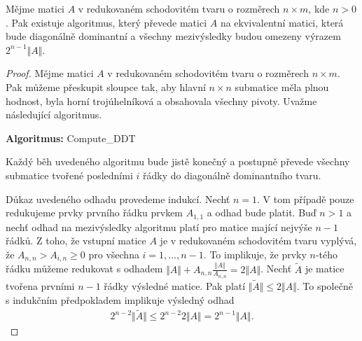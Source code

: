 \begin{lem} \label{DDT_Algo}
Mějme matici $ A $ v redukovaném schodovitém tvaru o rozměrech $ n \times m $,
kde $ n > 0 $.
Pak existuje algoritmus, který převede matici $ A $ na ekvivalentní matici, 
která bude diagonálně dominantní a všechny mezivýsledky budou omezeny výrazem
$ 2^{n - 1} \Vert A \Vert $.
\end{lem}
\begin{proof}
Mějme matici $ A $ v redukovaném schodovitém tvaru o rozměrech $ n \times m $. 
Pak můžeme přeskupit sloupce tak, aby hlavní $ n \times n $ submatice měla plnou
hodnost, byla horní trojúhelníková a obsahovala všechny pivoty. Uvažme 
následující algoritmus.\\
%
    \begin{algorithm} 
    {
        \textbf{Algoritmus:} Compute\_DDT
    }



    \end{algorithm} 

Každý běh uvedeného algoritmu bude jistě konečný a postupně převede všechny 
submatice tvořené posledními $ i $ řádky do diagonálně dominantního tvaru.

Důkaz uvedeného odhadu provedeme indukcí. Nechť $ n = 1 $. V tom případě pouze
redukujeme prvky prvního řádku prvkem $ A_{1,1} $ a odhad bude platit.
Buď $ n > 1 $ a nechť odhad na mezivýsledky algoritmu platí pro matice mající
nejvýše $ n - 1 $ řádků. Z toho, že vstupní matice $ A $ je v redukovaném 
schodovitém tvaru vyplývá, že $ A_{n,n} > A_{i, n} \geq 0 $ pro všechna 
$ i = 1, \dots, n - 1 $. To implikuje, že prvky $ n $-tého řádku můžeme redukovat
s odhadem $ \Vert A \Vert + A_{n,n} \frac{\Vert A \Vert} {A_{n,n}} = 2 \Vert A \Vert $.
Nechť $ \tilde{A} $ je matice tvořena prvními $ n - 1 $ řádky výsledné matice.
Pak platí $ \Vert \tilde{A} \Vert \leq 2 \Vert A \Vert $. To společně s
indukčním předpokladem implikuje výsledný odhad 
\begin{align*}
    2^{n - 2} \Vert \tilde{A} \Vert 
        \leq 2^{n - 2} 2 \Vert A \Vert 
        = 2^{n - 1} \Vert A \Vert.
\end{align*}
\end{proof}



